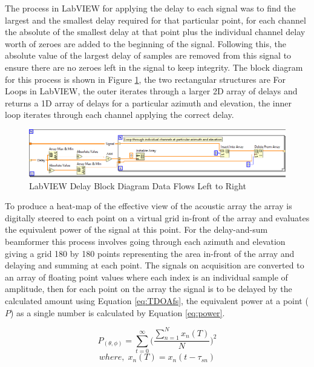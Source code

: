 \documentclass{UoNMCHA}
\numberwithin{equation}{section}
\begin{document}
    The process in LabVIEW for applying the delay to each signal was to find the largest and the smallest delay required for that particular point, for each channel the absolute of the smallest delay at that point plus the individual channel delay worth of zeroes are added to the beginning of the signal. Following this, the absolute value of the largest delay of samples are removed from this signal to ensure there are no zeroes left in the signal to keep integrity. The block diagram for this process is shown in Figure \ref{fig:DelayLabVIEW}, the two rectangular structures are For Loops in LabVIEW, the outer iterates through a larger 2D array of delays and returns a 1D array of delays for a particular azimuth and elevation, the inner loop iterates through each channel applying the correct delay.
    
    \begin{figure} [H]
        \centering
        \includegraphics[keepaspectratio, width = \textwidth]{Figures/DelayBlockDiagram.png}
        \caption{LabVIEW Delay Block Diagram Data Flows Left to Right}
        \label{fig:DelayLabVIEW}
    \end{figure}
    
    To produce a heat-map of the effective view of the acoustic array the array is digitally steered to each point on a virtual grid in-front of the array and evaluates the equivalent power of the signal at this point. For the delay-and-sum beamformer this process involves going through each azimuth and elevation giving a grid 180 by 180 points representing the area in-front of the array and delaying and summing at each point. The signals on acquisition are converted to an array of floating point values where each index is an individual sample of amplitude, then for each point on the array the signal is to be delayed by the calculated amount using Equation \ref{eq:TDOAfs}, the equivalent power at a point ($P$) as a single number is calculated by Equation \ref{eq:power}.
   
    \begin{equation}
        P_{(\theta, \phi)} = \sum_{t=0}^\infty\Big(\frac{\sum_{n=1}^N x_n(T)}{N}\Big)^2
        \label{eq:power}
    \end{equation}
    \begin{equation*}
        where,\;x_n(T) = x_n(t-\tau_{sn})
    \end{equation*}
    
\end{document}
